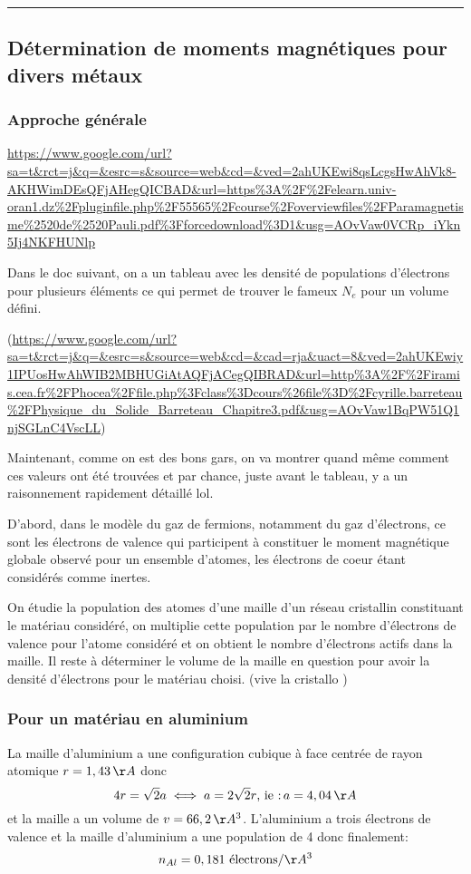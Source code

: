 \documentclass{report}
\begin{document}
\rule{\textwidth}{0.4pt}
\subsection{Détermination de moments magnétiques pour divers métaux}
\subsubsection{Approche générale}
\url{https://www.google.com/url?sa=t&rct=j&q=&esrc=s&source=web&cd=&ved=2ahUKEwi8qsLcgsHwAhVk8-AKHWimDEsQFjAHegQICBAD&url=https%3A%2F%2Felearn.univ-oran1.dz%2Fpluginfile.php%2F55565%2Fcourse%2Foverviewfiles%2FParamagnetisme%2520de%2520Pauli.pdf%3Fforcedownload%3D1&usg=AOvVaw0VCRp_iYkn5Ij4NKFHUNlp}

Dans le doc suivant, on a un tableau avec les densité de populations d'électrons pour plusieurs éléments ce qui permet de trouver le fameux $N_e$ pour un volume défini.

(\url{https://www.google.com/url?sa=t&rct=j&q=&esrc=s&source=web&cd=&cad=rja&uact=8&ved=2ahUKEwiy1IPUosHwAhWIB2MBHUGiAtAQFjACegQIBRAD&url=http%3A%2F%2Firamis.cea.fr%2FPhocea%2Ffile.php%3Fclass%3Dcours%26file%3D%2Fcyrille.barreteau%2FPhysique_du_Solide_Barreteau_Chapitre3.pdf&usg=AOvVaw1BqPW51Q1njSGLnC4VscLL})

Maintenant, comme on est des bons gars, on va montrer quand même comment ces valeurs ont été trouvées et par chance, juste avant le tableau, y a un raisonnement rapidement détaillé lol.

D'abord, dans le modèle du gaz de fermions, notamment du gaz d'électrons, ce sont les électrons de valence qui participent à constituer le moment magnétique globale observé pour un ensemble d'atomes, les électrons de coeur étant considérés comme inertes.

On étudie la population des atomes d'une maille d'un réseau cristallin constituant le matériau considéré, on multiplie cette population par le nombre d'électrons de valence pour l'atome considéré et on obtient le nombre d'électrons actifs dans la maille. Il reste à déterminer le volume de la maille en question pour avoir la densité d'électrons pour le matériau choisi. (vive la cristallo \smiley{})
\subsubsection{Pour un matériau en aluminium}

La maille d'aluminium a une configuration cubique à face centrée de rayon atomique $r=1,43\,\AA$ donc $$4r=\sqrt{2}a \iff a = 2\sqrt{2}r \mbox{, ie :} \, a = 4,04\,\AA$$
et la maille a un volume de $v = 66,2 \,\AA^3$. L'aluminium a trois électrons de valence et la maille d'aluminium a une population de 4 donc finalement:
$$n_{Al} = 0,181 \text{ électrons} / \AA^3$$
\end{document}
